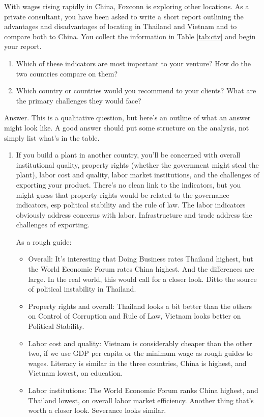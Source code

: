 \begin{enumerate}
With wages rising rapidly in China, Foxconn is exploring other locations.
As a private consultant, you have been asked to write a short report
outlining the advantages and disadvantages of locating in Thailand and Vietnam
and to compare both to China.
You collect the information in Table \ref{tab:ctv} and begin your report.

\begin{enumerate}
\item Which of these indicators are most important to your venture?
How do the two countries compare on them?
\item Which country or countries would you recommend to your clients?
What are the primary challenges they would face?
\end{enumerate}

Answer.
This is a qualitative question, but here's an outline
of what an answer might look like.
A good answer should put some structure on the analysis,
not simply list what's in the table.

\begin{enumerate}
\item If you build a plant in another country, you'll be concerned
with overall institutional quality,
property rights (whether the government might steal the plant),
labor cost and quality,
labor market institutions,
and the challenges of exporting your product.
There's no clean link to the indicators, but you might guess that
property rights would be related to the governance indicators,
esp political stability and the rule of law.
The labor indicators obviously address concerns with labor.
Infrastructure and trade address the challenges of exporting.

As a rough guide: 
\begin{itemize}
\item Overall:  It's interesting that Doing Business rates
Thailand highest, but the World Economic Forum rates China highest.
And the differences are large.  In the real world,
this would call for a closer look.
Ditto the source of political instability in Thailand.
\item Property rights and overall:  Thailand looks a bit better than the
others on Control of Corruption and Rule of Law, Vietnam looks better
on Political Stability.
\item Labor cost and quality:  Vietnam is considerably cheaper than the other two,
if we use GDP per capita or the minimum wage as rough guides to wages.
Literacy is similar in the three countries, China is highest, and Vietnam lowest,
on education.
\item Labor institutions:  The World Economic Forum ranks China highest,
and Thailand lowest, on overall labor market efficiency.
Another thing that's worth a closer look.
Severance looks similar.


\end{itemize}
\end{enumerate}
\end{enumerate}
